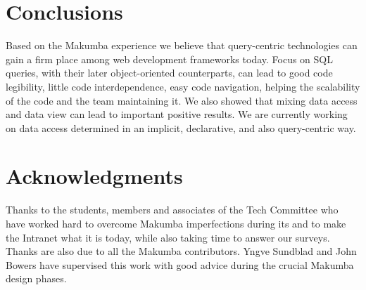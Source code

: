 \documentclass{chi2009}
\begin{document}
\section{Conclusions}\label{sec:conclusions}
Based on the Makumba experience we believe that query-centric technologies can gain a firm place among web development frameworks today. Focus on SQL queries, with their later object-oriented counterparts, can lead to good  code legibility, little code interdependence, easy code navigation,  helping the scalability of the code and the team maintaining it.  We also showed that mixing data access and data view can lead to important positive results. We are currently working on data access determined in an implicit, declarative, and also query-centric way. 

\section{Acknowledgments}\label{sec:acknowledgments}
Thanks to the students, members and associates of the Tech Committee who have worked hard to overcome Makumba imperfections during its  and to make the Intranet what it is today, while also taking time to answer our surveys.  Thanks are also due to all the Makumba contributors.  Yngve Sundblad and John Bowers have supervised this work with good advice during the crucial Makumba design phases.




\end{document}
